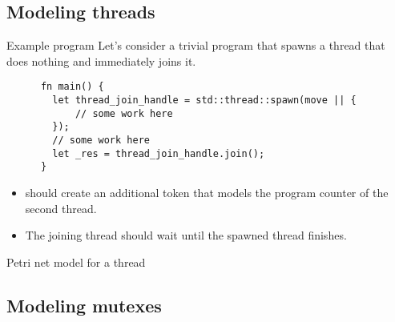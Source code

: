 \documentclass{beamer}
\begin{document}
\subsection{Modeling threads}

\begin{frame}[fragile]{Example program}
  Let's consider a trivial program that spawns a thread that does nothing
  and immediately joins it.

  \vfill

  \begin{listing}
    \begin{verbatim}
      fn main() {
        let thread_join_handle = std::thread::spawn(move || {
            // some work here
        });
        // some work here
        let _res = thread_join_handle.join();
      }   
    \end{verbatim}
  \end{listing}

  \vfill

  \begin{itemize}
    \item {} should create an additional token
          that models the program counter of the second thread.
    \item The joining thread should wait until the spawned thread finishes.
  \end{itemize}
\end{frame}

\begin{frame}{Petri net model for a thread}
  \begin{figure}
    \centering
    
  \end{figure}
\end{frame}

\subsection{Modeling mutexes}
\end{document}
